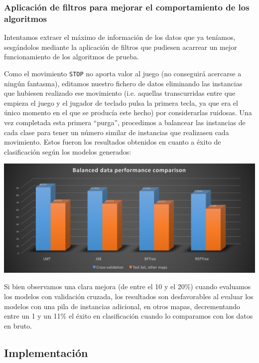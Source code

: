 \documentclass[12pt]{article}
\begin{document}
\subsubsection{Aplicación de filtros para mejorar el comportamiento de los algoritmos}

Intentamos extraer el máximo de información de los datos que ya teníamos, sesgándolos mediante la aplicación de filtros que pudiesen acarrear un mejor funcionamiento de los algoritmos de prueba.

Como el movimiento \texttt{STOP} no aporta valor al juego (no conseguirá acercarse a ningún fantasma), editamos nuestro fichero de datos eliminando las instancias que hubiesen realizado ese movimiento (i.e. aquellas transcurridas entre que empieza el juego y el jugador de teclado pulsa la primera tecla, ya que era el único momento en el que se producía este hecho) por considerarlas ruidosas. Una vez completada esta primera ``purga'', procedimos a balancear las instancias de cada clase para tener un número similar de instancias que realizasen cada movimiento. Estos fueron los resultados obtenidos en cuanto a éxito de clasificación según los modelos generados:

\newpage
\noindent \includegraphics[width=\textwidth]{balanced_performance}

\vspace{0.3cm}

Si bien observamos una clara mejora (de entre el 10 y el 20\%) cuando evaluamos los modelos con validación cruzada, los resultados son desfavorables al evaluar los modelos con una pila de instancias adicional, en otros mapas, decrementando entre un 1 y un 11\% el éxito en clasificación cuando lo comparamos con los datos en bruto.

\subsection{Implementación}
\end{document}
